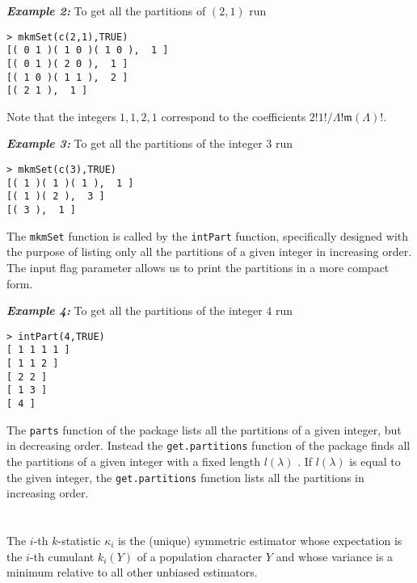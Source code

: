 \hskip-0.5cm\textbf{\emph{Example 2:}} To get all the partitions of
\((2,1)\) run

\begin{verbatim}
> mkmSet(c(2,1),TRUE)
[( 0 1 )( 1 0 )( 1 0 ),  1 ]
[( 0 1 )( 2 0 ),  1 ]
[( 1 0 )( 1 1 ),  2 ]   
[( 2 1 ),  1 ] 
\end{verbatim}

\hskip-0.5cm Note that the integers \(1,1,2,1\) correspond to the
coefficients \(2! 1!/\Lambda! \mathfrak{m}(\Lambda)!.\)

\hskip-0.5cm\textbf{\emph{Example 3:}} To get all the partitions of the
integer \(3\) run

\begin{verbatim}
> mkmSet(c(3),TRUE)
[( 1 )( 1 )( 1 ),  1 ]
[( 1 )( 2 ),  3 ]
[( 3 ),  1 ]
\end{verbatim}

The \texttt{mkmSet} function is called by the \texttt{intPart} function,
specifically designed with the purpose of listing only all the
partitions of a given integer in increasing order. The input flag
parameter allows us to print the partitions in a more compact form.

\hskip-0.5cm\textbf{\emph{Example 4:}} To get all the partitions of the
integer \(4\) run

\begin{verbatim}
> intPart(4,TRUE)
[ 1 1 1 1 ]
[ 1 1 2 ]
[ 2 2 ]
[ 1 3 ]
[ 4 ]
\end{verbatim}

The \texttt{parts} function of the  package
\citep{partitions} lists all the partitions of a given integer, but in
decreasing order. Instead the \texttt{get.partitions} function of the
 package \citep{nilde} finds all the partitions of a
given integer with a fixed length \(l(\lambda)\) \citep{Voinov1439641}.
If \(l(\lambda)\) is equal to the given integer, the
\texttt{get.partitions} function lists all the partitions in increasing
order.

\hypertarget{section}{%
\section{\texorpdfstring{}{}}\label{section}}

The \(i\)-th \(k\)-statistic \(\kappa_i\) is the (unique) symmetric
estimator whose expectation is the \(i\)-th cumulant \(k_i(Y)\) of a
population character \(Y\) and whose variance is a minimum relative to
all other unbiased estimators.

